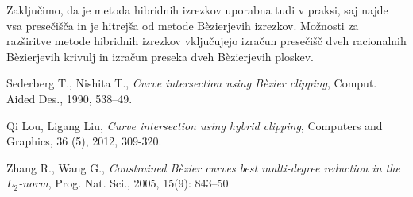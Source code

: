 \documentclass[12pt,a4paper, reqno]{amsart}
\begin{document}
Zaključimo, da je metoda hibridnih izrezkov uporabna tudi v praksi, saj najde vsa presečišča in je hitrejša od metode B\`{e}zierjevih izrezkov. Možnosti za razširitve metode hibridnih izrezkov vključujejo izračun presečišč dveh racionalnih B\`{e}zierjevih krivulj in izračun preseka dveh B\`{e}zierjevih ploskev.

\begin{thebibliography}{99}

 Sederberg T., Nishita T., {\em Curve intersection using B\`{e}zier clipping}, Comput.
Aided Des., 1990, 538--49.

Qi Lou, Ligang Liu, {\em Curve intersection using hybrid clipping}, Computers and
Graphics, 36 (5), 2012, 309-320.

Zhang R., Wang G., {\em Constrained B\`{e}zier curves best multi-degree reduction in
the $L_2$-norm}, Prog. Nat. Sci., 2005, 15(9): 843–50

%

\end{thebibliography}
\end{document}
